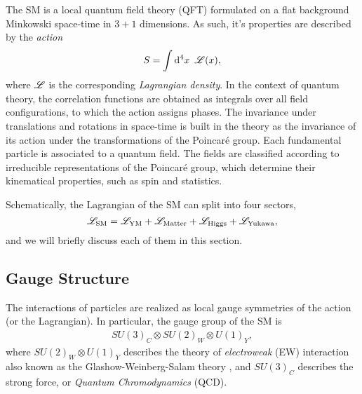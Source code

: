 The SM is a local quantum field theory (QFT) formulated on a flat background Minkowski space-time in $3+1$ dimensions.
As such, it's properties are described by the \emph{action}
\[
  S = \int \dd[4]{x}~{\mathscr{L}}(x),
\]
where ${\mathscr{L}}$ is the corresponding \emph{Lagrangian density}. 
In the context of quantum theory, the correlation functions
are obtained as integrals over all field configurations, to which the action assigns phases.
The invariance under translations and rotations in space-time is built in the theory as the
invariance of its action under the transformations of the Poincaré group.
Each fundamental particle is associated to a quantum field.
The fields are classified according to irreducible representations of the Poincaré group,
which determine their kinematical properties, such as spin and statistics.


Schematically, the Lagrangian of the SM can split into four sectors,
\begin{equation}
  {\mathscr{L}}_{\text{SM}} = {\mathscr{L}}_{\text{YM}} + {\mathscr{L}}_{\text{Matter}} + {\mathscr{L}}_{\text{Higgs}} + {\mathscr{L}}_{\text{Yukawa}},
\end{equation}
and we will briefly discuss each of them in this section.

\subsection{Gauge Structure}
\label{sec:giym}

The interactions of particles are realized as local gauge symmetries of the action (or the Lagrangian).
In particular, the gauge group of the SM is
\begin{align}\label{eq:SMgauge}
  SU(3)_C\otimes SU(2)_W \otimes U(1)_Y,
\end{align}
where $SU(2)_W \otimes U(1)_Y$ describes the theory of \emph{electroweak} (EW)
interaction also known as the Glashow-Weinberg-Salam theory \cite{Glashow1961a,Weinberg1967a,Salam1968,Glashow1970},
and $SU(3)_C$ describes the strong force, or \emph{Quantum Chromodynamics} (QCD).

